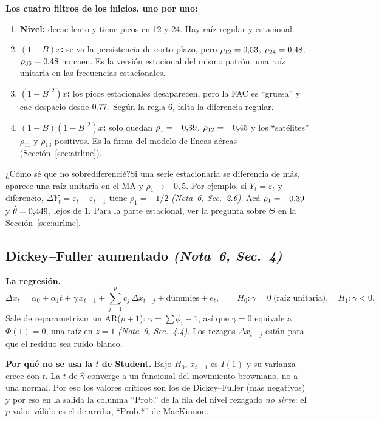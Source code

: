 \documentclass[11pt,a4paper]{article}
\newcommand{\nota}[2]{\textit{(Nota~#1, Sec.~#2)}}
\newcommand{\Q}[2]{\begin{pregunta}{#1}#2\end{pregunta}}
\begin{document}
\textbf{Los cuatro filtros de los inicios, uno por uno:}
\begin{enumerate}[leftmargin=1.4em]
\item \textbf{Nivel:} decae lento y tiene picos en 12 y 24. Hay ra\'iz regular y estacional.
\item \textbf{$(1-B)x$:} se va la persistencia de corto plazo, pero $\rho_{12}=0{,}53$, $\rho_{24}=0{,}48$, $\rho_{36}=0{,}48$ no caen. Es la versi\'on estacional del mismo patr\'on: una ra\'iz unitaria en las frecuencias estacionales.
\item \textbf{$(1-B^{12})x$:} los picos estacionales desaparecen, pero la FAC es ``gruesa'' y cae despacio desde $0{,}77$. Seg\'un la regla 6, falta la diferencia regular.
\item \textbf{$(1-B)(1-B^{12})x$:} solo quedan $\rho_1=-0{,}39$, $\rho_{12}=-0{,}45$ y los ``sat\'elites'' $\rho_{11}$ y $\rho_{13}$ positivos. Es la firma del modelo de l\'ineas a\'ereas (Secci\'on~\ref{sec:airline}).
\end{enumerate}

\Q{¿C\'omo s\'e que no sobrediferenci\'e?}{Si una serie estacionaria se diferencia de m\'as, aparece una ra\'iz unitaria en el MA y $\rho_1\to-0{,}5$. Por ejemplo, si $Y_t=\varepsilon_t$ y diferencio, $\Delta Y_t=\varepsilon_t-\varepsilon_{t-1}$ tiene $\rho_1=-1/2$ \nota{6}{2.6}. Ac\'a $\rho_1=-0{,}39$ y $\hat\theta=0{,}449$, lejos de 1. Para la parte estacional, ver la pregunta sobre $\Theta$ en la Secci\'on~\ref{sec:airline}.}

\subsection{Dickey--Fuller aumentado \nota{6}{4}}
\textbf{La regresi\'on.}
\[
\Delta x_t=\alpha_0+\alpha_1t+\gamma\,x_{t-1}+\sum_{j=1}^{p}c_j\,\Delta x_{t-j}+\text{dummies}+e_t,\qquad H_0:\gamma=0\ \text{(ra\'iz unitaria)},\quad H_1:\gamma<0 .
\]
Sale de reparametrizar un AR($p+1$): $\gamma=\sum\phi_i-1$, as\'i que $\gamma=0$ equivale a $\Phi(1)=0$, una ra\'iz en $z=1$ \nota{6}{4.4}. Los rezagos $\Delta x_{t-j}$ est\'an para que el residuo sea ruido blanco.

\textbf{Por qu\'e no se usa la $t$ de Student.} Bajo $H_0$, $x_{t-1}$ es $I(1)$ y su varianza crece con $t$. La $t$ de $\hat\gamma$ converge a un funcional del movimiento browniano, no a una normal. Por eso los valores cr\'iticos son los de Dickey--Fuller (m\'as negativos) y por eso en la salida la columna ``Prob.'' de la fila del nivel rezagado \emph{no sirve}: el $p$-valor v\'alido es el de arriba, ``Prob.*'' de MacKinnon.
\end{document}
